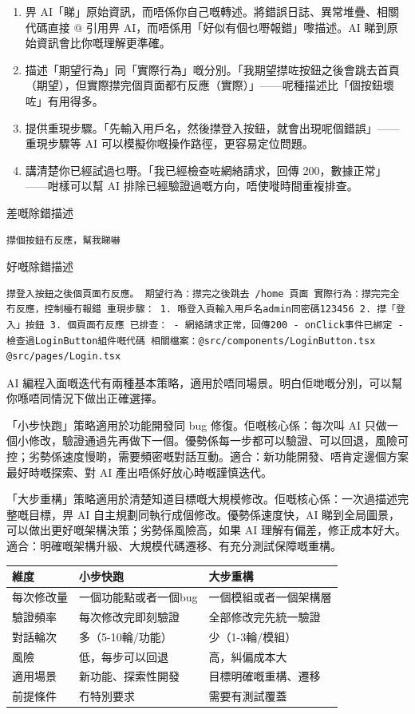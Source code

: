 \begin{enumerate}
  \item 畀 AI「睇」原始資訊，而唔係你自己嘅轉述。將錯誤日誌、異常堆疊、相關代碼直接 @ 引用畀 AI，而唔係用「好似有個乜嘢報錯」嚟描述。AI 睇到原始資訊會比你嘅理解更準確。
  \item 描述「期望行為」同「實際行為」嘅分別。「我期望㩒咗按鈕之後會跳去首頁（期望），但實際㩒完個頁面都冇反應（實際）」——呢種描述比「個按鈕壞咗」有用得多。
  \item 提供重現步驟。「先輸入用戶名，然後㩒登入按鈕，就會出現呢個錯誤」——重現步驟等 AI 可以模擬你嘅操作路徑，更容易定位問題。
  \item 講清楚你已經試過乜嘢。「我已經檢查咗網絡請求，回傳 200，數據正常」——咁樣可以幫 AI 排除已經驗證過嘅方向，唔使嘥時間重複排查。
\end{enumerate}

差嘅除錯描述

\begin{lstlisting}
㩒個按鈕冇反應，幫我睇嚇
\end{lstlisting}

好嘅除錯描述

\begin{lstlisting}
㩒登入按鈕之後個頁面冇反應。 期望行為：㩒完之後跳去 /home 頁面 實際行為：㩒完完全冇反應，控制檯冇報錯 重現步驟： 1. 喺登入頁輸入用戶名admin同密碼123456 2. 㩒「登入」按鈕 3. 個頁面冇反應 已排查： - 網絡請求正常，回傳200 - onClick事件已綁定 - 檢查過LoginButton組件嘅代碼 相關檔案：@src/components/LoginButton.tsx @src/pages/Login.tsx
\end{lstlisting}


AI 編程入面嘅迭代有兩種基本策略，適用於唔同場景。明白佢哋嘅分別，可以幫你喺唔同情況下做出正確選擇。

「小步快跑」策略適用於功能開發同 bug 修復。佢嘅核心係：每次叫 AI 只做一個小修改，驗證通過先再做下一個。優勢係每一步都可以驗證、可以回退，風險可控；劣勢係速度慢啲，需要頻密嘅對話互動。適合：新功能開發、唔肯定邊個方案最好時嘅探索、對 AI 產出唔係好放心時嘅謹慎迭代。

「大步重構」策略適用於清楚知道目標嘅大規模修改。佢嘅核心係：一次過描述完整嘅目標，畀 AI 自主規劃同執行成個修改。優勢係速度快，AI 睇到全局圖景，可以做出更好嘅架構決策；劣勢係風險高，如果 AI 理解有偏差，修正成本好大。適合：明確嘅架構升級、大規模代碼遷移、有充分測試保障嘅重構。

\begin{center}
\begin{tabularx}{\linewidth}{|X|X|X|}
\hline
\textbf{維度} & \textbf{小步快跑} & \textbf{大步重構} \tabularnewline
\hline
每次修改量 & 一個功能點或者一個bug & 一個模組或者一個架構層 \tabularnewline
驗證頻率 & 每次修改完即刻驗證 & 全部修改完先統一驗證 \tabularnewline
對話輪次 & 多（5-10輪/功能） & 少（1-3輪/模組） \tabularnewline
風險 & 低，每步可以回退 & 高，糾偏成本大 \tabularnewline
適用場景 & 新功能、探索性開發 & 目標明確嘅重構、遷移 \tabularnewline
前提條件 & 冇特別要求 & 需要有測試覆蓋 \tabularnewline
\hline
\end{tabularx}
\end{center}

